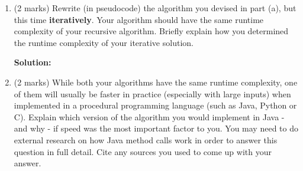 \documentclass[a4,13pt]{extarticle}
\newenvironment{Solution}{\color{blue}\textbf{Solution:}}{}
\begin{document}
\begin{enumerate}
\begin{enumerate}
\begin{enumerate}
					\begin{Solution}
							
	      	        \end{Solution}
	      	
	      	      	\item (1 mark) Use the master theorem to find a Big-$\Theta$ bound for the recurrence defined by $$T(n)=5 \cdot T\left(\frac{n}{3}\right) + n^2 + 2n$$ and $T(1)=100$. Show all working.
	      	      	      	
	      	      	\begin{Solution}
	      	        \end{Solution}
	      	
	      	      	\item (1 mark) Use the master theorem to find a Big-$\Theta$ bound for the recurrence defined by $$T(n)=8 \cdot T\left(\frac{n}{4}\right) + 5n + 2\log n +\frac 1n $$ and $T(1)=1$. Show all working.
	      	      	
	      	      	\begin{Solution}
	      	        \end{Solution}
	      	      \end{enumerate}
	      	      	      	                  
	      	\item (2 marks) Rewrite (in pseudocode) the algorithm you devised in part (a), but this time \textbf{iteratively}. 
	      	      Your algorithm should have the same runtime complexity of your recursive algorithm. Briefly explain how you determined the runtime complexity of your iterative solution.
	      	      
	      	\begin{Solution}
	      	\end{Solution}
	      	      	      	                  
	      	\item (2 marks) While both your algorithms have the same runtime complexity, one of them will usually be faster in practice 
	      	      (especially with large inputs) when implemented in a procedural programming language (such as Java, Python or C). 
	      	      Explain which version of the algorithm you would implement in Java - and why - if speed was the most important factor to you. 
	      	      You may need to do external research on how Java method calls work in order to answer this question in full detail. 
	      	      Cite any sources you used to come up with your answer.\\
	      	      	      	                  

\end{enumerate}
\end{enumerate}
\end{document}
